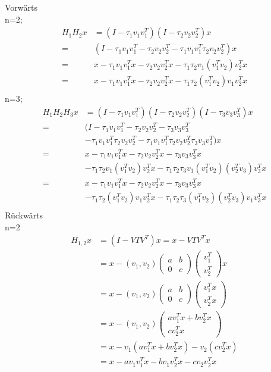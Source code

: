 Vorwärts \\
n=2;
\begin{align*}
	H_1 H_2 x &= (I-\tau_1 v_1 v_1^T)(I-\tau_2 v_2 v_2^T)x\\
	= &(I - \tau_1 v_1 v_1^T - \tau_2 v_2 v_2^T -  \tau_1 v_1 v_1^T \tau_2 v_2 v_2^T )x\\
  = &x - \tau_1 v_1 v_1^T x - \tau_2 v_2 v_2^T x - \tau_1 \tau_2 v_1 (v_1^T v_2 )v_2^T x\\
  = &x - \tau_1 v_1 v_1^T x - \tau_2 v_2 v_2^T x - \tau_1 \tau_2 (v_1^T v_2 ) v_1 v_2^T x\\
\end{align*}
n=3;
\begin{align*}
	H_1 H_2 H_3 x &= (I-\tau_1 v_1 v_1^T)(I-\tau_2 v_2 v_2^T)(I-\tau_3 v_3 v_3^T)x\\
	= &(I - \tau_1 v_1 v_1^T - \tau_2 v_2 v_2^T - \tau_3 v_3 v_3^T\\
    &- \tau_1 v_1 v_1^T \tau_2 v_2 v_2^T - \tau_1 v_1 v_1^T \tau_2 v_2 v_2^T \tau_3 v_3 v_3^T )x \\
  = &x - \tau_1 v_1 v_1^T x - \tau_2 v_2 v_2^T x - \tau_3 v_3 v_3^T x\\
    &- \tau_1 \tau_2 v_1 (v_1^T v_2 )v_2^T x- \tau_1 \tau_2 \tau_3 v_1 ( v_1^T v_2)( v_2^T v_3) v_3^T x \\
  = &x - \tau_1 v_1 v_1^T x - \tau_2 v_2 v_2^T x - \tau_3 v_3 v_3^T x \\
    &- \tau_1 \tau_2 (v_1^T v_2 ) v_1 v_2^T x- \tau_1 \tau_2 \tau_3 ( v_1^T v_2)( v_2^T v_3) v_1 v_3^T x \\
\end{align*}
Rückwärts\\
n=2
\begin{align*}
  H_{1,2} x &= (I - V T V^T) x = x - V T V^T x\\
  &= x - (v_1, v_2)
  \begin{pmatrix}
    a & b \\ 0 & c
  \end{pmatrix}
  \begin{pmatrix}
    v_1^T \\ v_2^T 
  \end{pmatrix}
  x\\
  &= x - (v_1, v_2)
  \begin{pmatrix}
    a & b \\ 0 & c
  \end{pmatrix}
  \begin{pmatrix}
    v_1^T x \\ v_2^T x
  \end{pmatrix}\\
  &= x - (v_1, v_2)
  \begin{pmatrix}
    a v_1^T x + b v_2^T x\\  c v_2^T x
  \end{pmatrix}\\
  &= x - v_1(a v_1^T x + b v_2^T x) - v_2 (c v_2^T x)\\
  &= x - a v_1 v_1^T x - b v_1 v_2^T x - c v_2 v_2^T x
\end{align*}
